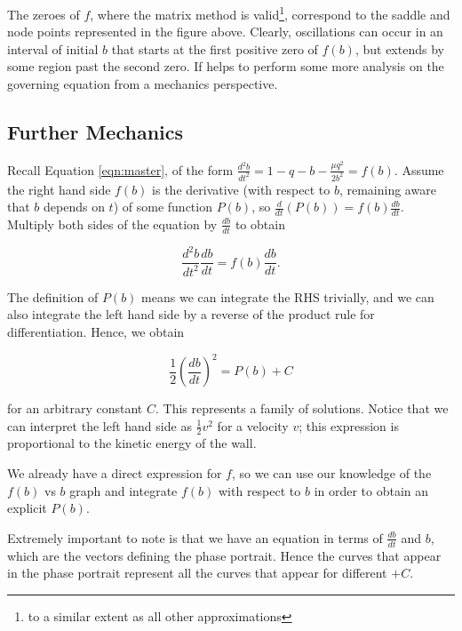 \documentclass{article}
\begin{document}

The zeroes of $f$, where the matrix method is valid\footnote{to a similar extent as all other approximations},
correspond to the saddle and node points represented in the figure above. %
Clearly, oscillations can occur in an interval of initial $b$ that starts at the first positive zero of $f(b)$,
but extends by some region past the second zero.
If helps to perform some more analysis on the governing equation from a mechanics perspective.

\subsection{Further Mechanics}

Recall Equation \ref{eqn:master}, of the form $\frac{d^2b}{dt^2} = 1 - q - b - \frac{\mu q^2}{2 b^2} = f(b)$.
Assume the right hand side $f(b)$ is the derivative (with respect to $b$, remaining aware that $b$ depends on $t$) of some function $P(b)$,
so $\frac{d}{dt}\left(P(b)\right) = f(b)\frac{db}{dt}.$ %
Multiply both sides of the equation by $\frac{db}{dt}$ to obtain

\begin{equation*}
    \frac{d^2b}{dt^2} \frac{db}{dt} = f(b) \frac{db}{dt}.
\end{equation*}

The definition of $P(b)$ means we can integrate the RHS trivially,
and we can also integrate the left hand side by a reverse of the product rule for differentiation.
Hence, we obtain

\begin{equation}
    \frac{1}{2}\left(\frac{db}{dt}\right)^2 = P(b) + C
    \label{eqn:integral_kinetic_energy}
\end{equation}

for an arbitrary constant $C$. This represents a family of solutions.
Notice that we can interpret the left hand side as $\frac{1}{2}v^2$ for a velocity $v$;
this expression is proportional to the kinetic energy of the wall.

We already have a direct expression for $f$,
so we can use our knowledge of the $f(b)$ vs $b$ graph and integrate $f(b)$ with respect to $b$
in order to obtain an explicit $P(b)$.

Extremely important to note is that we have an equation in terms of $\frac{db}{dt}$ and $b$, which are the vectors defining the phase portrait.
Hence the curves that appear in the phase portrait represent all the curves that appear for different $+C$.
\end{document}
